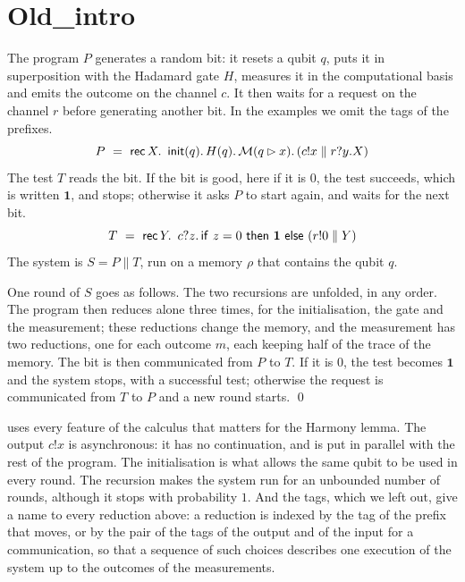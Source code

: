 \section{Old\_intro}\label{app:old-intro}

\begin{example}\label{ex:rbg}
The program $P$ generates a random bit: it resets a qubit $q$, puts it in
superposition with the Hadamard gate $H$, measures it in the computational
basis and emits the outcome on the channel $c$. It then waits for a request
on the channel $r$ before generating another bit. In the examples we omit the
tags of the prefixes.
\[
P \ =\ \rec{X}{\ \mathsf{init}(q).\,H(q).\,\M(q \rhd x).\,
       (c!x \parallel r?y.X)}
\]
The test $T$ reads the bit. If the bit is good, here if it is $0$, the test
succeeds, which is written $\mathbf{1}$, and stops; otherwise it asks $P$ to
start again, and waits for the next bit.
\[
T \ =\ \mathsf{rec}\,Y.\,\ c?z.\,\mathsf{if}\ z = 0\ \mathsf{then}\ \mathbf{1}\ \mathsf{else}\ (r!0 \parallel Y)
\]
The system is $S = P \parallel T$, run on a memory
$\rho$ that contains the qubit $q$.

One round of $S$ goes as follows. The two recursions are unfolded, in any
order. The program then reduces alone three times, for the initialisation,
the gate and the measurement; these reductions change the memory, and the
measurement has two reductions, one for each outcome $m$, each keeping half
of the trace of the memory. The bit is then communicated from $P$ to $T$. If
it is $0$, the test becomes $\mathbf{1}$ and the system stops, with a
successful test; otherwise the request is communicated from $T$ to $P$ and a
new round starts.
\qed
\end{example}

 uses every feature of the calculus that matters for the Harmony
lemma. The output $c!x$ is asynchronous: it has no continuation, and is put
in parallel with the rest of the program. The initialisation is what allows
the same qubit to be used in every round. The recursion makes the system run
for an unbounded number of rounds, although it stops with probability $1$.
And the tags, which we left out, give a name to every reduction above: a
reduction is indexed by the tag of the prefix that moves, or by the pair of
the tags of the output and of the input for a communication, so that a
sequence of such choices describes one execution of the system up to the
outcomes of the measurements.

